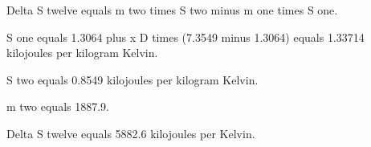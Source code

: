 Delta S twelve equals m two times S two minus m one times S one.

S one equals 1.3064 plus x D times (7.3549 minus 1.3064) equals 1.33714 kilojoules per kilogram Kelvin.

S two equals 0.8549 kilojoules per kilogram Kelvin.

m two equals 1887.9.

Delta S twelve equals 5882.6 kilojoules per Kelvin.